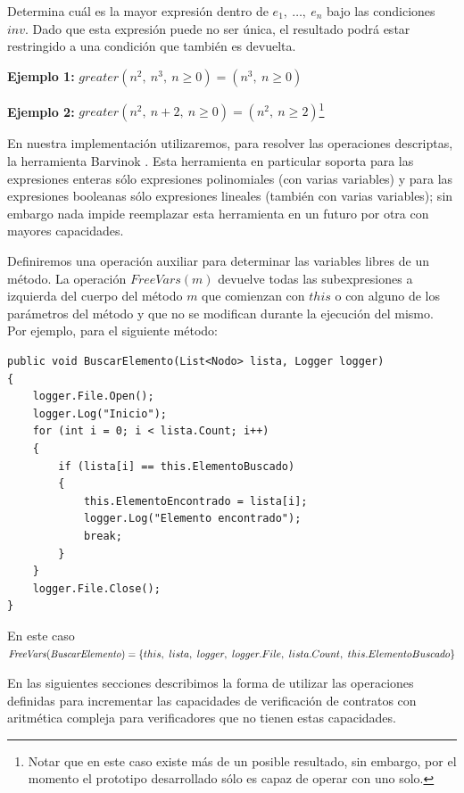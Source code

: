 \documentclass[12pt,a4paper]{article}
\begin{document}
\begin{itemize}
						\vspace{5pt}
						Determina cuál es la mayor expresión dentro de $e_1,\ \dots,\ e_n$ bajo las condiciones $inv$. Dado que esta expresión puede no ser única, el resultado podrá estar restringido a una condición que también es devuelta.

						\vspace{5pt}
						\textbf{Ejemplo 1:} $greater(n^2,\ n^3,\ n \geq 0) = (n^3,\ n \geq 0)$

						\vspace{5pt}
						\textbf{Ejemplo 2:} $greater(n^2,\ n + 2,\ n \geq 0) = (n^2,\ n \geq 2)$\footnote{Notar que en este caso existe más de un posible resultado, sin embargo, por el momento el prototipo desarrollado sólo es capaz de operar con uno solo.}
				\end{itemize}

		En nuestra implementación utilizaremos, para resolver las operaciones descriptas, la herramienta Barvinok \cite{barvinok}. Esta herramienta en particular soporta para las expresiones enteras sólo expresiones polinomiales (con varias variables) y para las expresiones booleanas sólo expresiones lineales (también con varias variables); sin embargo nada impide reemplazar esta herramienta en un futuro por otra con mayores capacidades.

		Definiremos una operación auxiliar para determinar las variables libres de un método. La operación $\mathit{FreeVars}(m)$ devuelve todas las subexpresiones a izquierda del cuerpo del método $m$ que comienzan con $this$ o con alguno de los parámetros del método y que no se modifican durante la ejecución del mismo. Por ejemplo, para el siguiente método:
		\vspace{5pt}
		\begin{lstlisting}[caption=Ejemplo de $\mathit{FreeVars}$]
public void BuscarElemento(List<Nodo> lista, Logger logger)
{
	logger.File.Open();
	logger.Log("Inicio");
	for (int i = 0; i < lista.Count; i++)
	{
		if (lista[i] == this.ElementoBuscado)
		{
			this.ElementoEncontrado = lista[i];
			logger.Log("Elemento encontrado");
			break;
		}
	}
	logger.File.Close();
}
		\end{lstlisting}

		En este caso $\mathit{FreeVars}(\mathit{BuscarElemento}) = \{this,\ lista,\ logger,\ logger.File,\\\ lista.Count,\ this.ElementoBuscado\}$

		En las siguientes secciones describimos la forma de utilizar las operaciones definidas para incrementar las capacidades de verificación de contratos con aritmética compleja para verificadores que no tienen estas capacidades.
\end{document}
